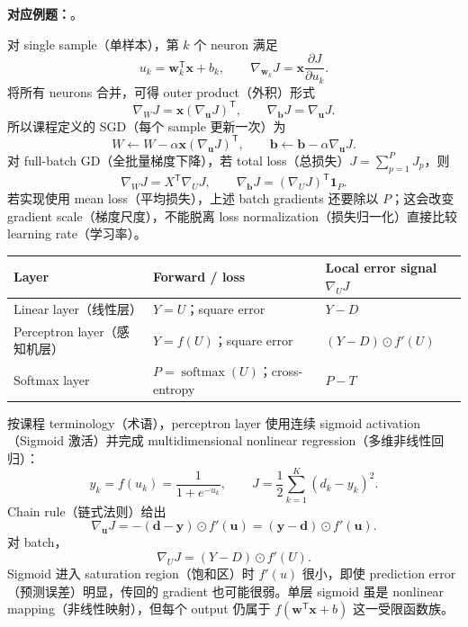 \textbf{对应例题：}。


对 single sample（单样本），第 $k$ 个 neuron 满足
\[
  u_k=\bm w_k^{\mathsf T}\bm x+b_k,
  \qquad
  \nabla_{\bm w_k}J=\bm x\frac{\partial J}{\partial u_k}.
\]
将所有 neurons 合并，可得 outer product（外积）形式
\[
  \boxed{\nabla_WJ=\bm x(\nabla_{\bm u}J)^{\mathsf T}},
  \qquad
  \boxed{\nabla_{\bm b}J=\nabla_{\bm u}J}.
\]
所以课程定义的 SGD（每个 sample 更新一次）为
\[
  W\leftarrow W-\alpha\bm x(\nabla_{\bm u}J)^{\mathsf T},
  \qquad
  \bm b\leftarrow\bm b-\alpha\nabla_{\bm u}J.
\]
对 full-batch GD（全批量梯度下降），若 total loss（总损失）$J=\sum_{p=1}^{P}J_p$，则
\[
  \boxed{\nabla_WJ=X^{\mathsf T}\nabla_UJ},
  \qquad
  \boxed{\nabla_{\bm b}J=(\nabla_UJ)^{\mathsf T}\bm 1_P}.
\]
若实现使用 mean loss（平均损失），上述 batch gradients 还要除以 $P$；这会改变 gradient scale（梯度尺度），不能脱离 loss normalization（损失归一化）直接比较 learning rate（学习率）。

\begin{center}
\small
\begin{tabularx}{\textwidth}{@{}>{\raggedright\arraybackslash}p{3.0cm}>{\raggedright\arraybackslash}p{3.5cm}X@{}}
  \toprule
  Layer & Forward / loss & Local error signal $\nabla_UJ$ \\
  \midrule
  Linear layer（线性层） & $Y=U$；square error & $Y-D$ \\
  Perceptron layer（感知机层） & $Y=f(U)$；square error & $(Y-D)\odot f'(U)$ \\
  Softmax layer & $P=\operatorname{softmax}(U)$；cross-entropy & $P-T$ \\
  \bottomrule
\end{tabularx}
\end{center}


按课程 terminology（术语），perceptron layer 使用连续 sigmoid activation（Sigmoid 激活）并完成 multidimensional nonlinear regression（多维非线性回归）：
\[
  y_k=f(u_k)=\frac{1}{1+e^{-u_k}},
  \qquad
  J=\frac12\sum_{k=1}^{K}(d_k-y_k)^2.
\]
Chain rule（链式法则）给出
\[
  \boxed{\nabla_{\bm u}J
    =-(\bm d-\bm y)\odot f'(\bm u)
    =(\bm y-\bm d)\odot f'(\bm u)}.
\]
对 batch，
\[
  \boxed{\nabla_UJ=(Y-D)\odot f'(U)}.
\]
Sigmoid 进入 saturation region（饱和区）时 $f'(u)$ 很小，即使 prediction error（预测误差）明显，传回的 gradient 也可能很弱。单层 sigmoid 虽是 nonlinear mapping（非线性映射），但每个 output 仍属于 $f(\bm w^{\mathsf T}\bm x+b)$ 这一受限函数族。

